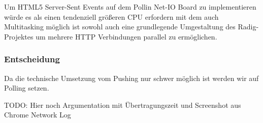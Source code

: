 Um HTML5 Server-Sent Events auf dem Pollin Net-IO Board zu implementieren würde es als 
einen tendenziell größeren CPU erfordern mit dem auch Multitasking möglich ist sowohl auch 
eine grundlegende Umgestaltung des Radig-Projektes um mehrere HTTP Verbindungen parallel 
zu ermöglichen.

\subsubsection{Entscheidung}
Da die technische Umsetzung vom Pushing nur schwer möglich ist werden wir auf Polling 
setzen.

TODO: Hier noch Argumentation mit Übertragungszeit und Screenshot aus Chrome Network Log


%	
